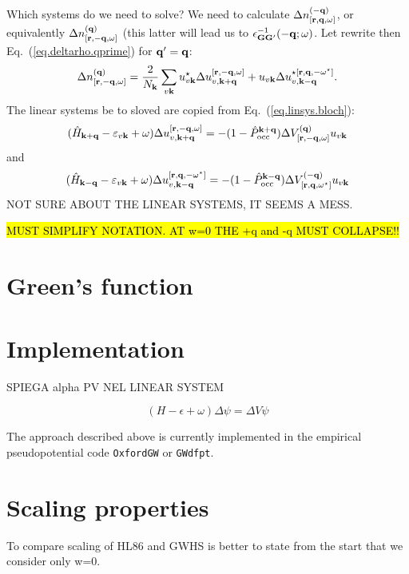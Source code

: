 \documentclass[twocolumn,prb,showpacs,superscriptaddress]{revtex4}
\def\w{\omega}
\def\H{\hat{H}}
\def\P{\hat{P}_{\rm occ}}
\def\E{\varepsilon}
\def\q{{\bf q}}
\def\k{{\bf k}}
\def\qp{{\bf q^\prime}}
\def\G{{\bf G}}
\def\Gp{{\bf G^\prime}}
\def\r{{\bf r}}
\begin{document}
Which systems do we need to solve? We need to calculate $\Delta n_{[\r,\q,\w]}^{(-\q)}$,
or equivalently $\Delta n_{[\r,-\q,\w]}^{(\q)}$ (this latter will lead us to 
$\epsilon^{-1}_{\G\Gp}(-\q;\w)$.
Let rewrite then Eq.\ (\ref{eq.deltarho.qprime}) for $\qp=\q$:
  \begin{equation}
  \Delta n_{[\r,-\q,\w]}^{(\q)} = \frac{2}{N_\k}\sum_{v\k} u_{v\k}^\star \Delta u_{v,\k+\q}^{[\r,-\q,\w]} +
      u_{v\k} \Delta u_{v,\k-\q}^{\star[\r,\q,-\w^\star]} .
  \end{equation}
The linear systems be to sloved are copied from Eq.\ (\ref{eq.linsys.bloch}):
  \begin{equation}
  (\H_{\k+\q}-\E_{v\k}+\w) \Delta u_{v,\k+\q}^{[\r,-\q,\w]}  =  
  -(1-\P^{\k+\q})  \Delta V_{[\r,-\q,\w]}^{(\q)} u_{v\k}
  \end{equation}
and
  \begin{equation}
  (\H_{\k-\q}-\E_{v\k}+\w) \Delta u_{v,\k-\q}^{[\r,\q,-\w^\star]}  =  
  -(1-\P^{\k-\q})  \Delta V_{[\r,\q,\w^\star]}^{(-\q)} u_{v\k}
  \end{equation}
NOT SURE ABOUT THE LINEAR SYSTEMS, IT SEEMS A MESS.

\hl{MUST SIMPLIFY NOTATION. AT w=0 THE +q and -q MUST COLLAPSE!!}
 

\section{Green's function}

\section{Implementation}

SPIEGA alpha PV NEL LINEAR SYSTEM

\begin{equation}\label{eq.linsys.1}
(H - \epsilon +\w) \Delta\psi = \Delta V \psi
\end{equation}


The approach described above is currently implemented in the empirical
pseudopotential code {\tt OxfordGW} or {\tt GWdfpt}. 

\section{Scaling properties}

To compare scaling of HL86 and GWHS is better to state from the start that
we consider only w=0.
\end{document}
